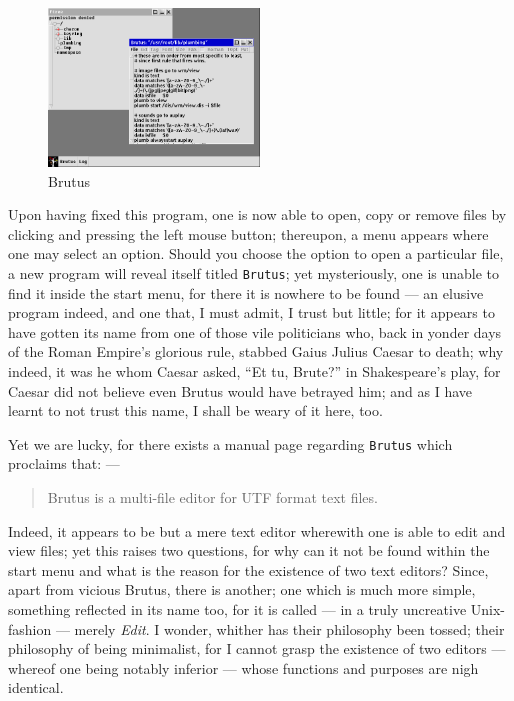 \documentclass[a5paper,twoside,12pt]{report}
\begin{document}
  \begin{figure}
    \centering
    \includegraphics[width=0.5\textwidth]{imgs/brutus.png}
    \caption{Brutus}
  \end{figure}

  Upon having fixed this program, one is now able to open, copy or remove files by clicking and pressing the left mouse button; thereupon, a menu appears where one may select an option. Should you choose the option to open a particular file, a new program will reveal itself titled \texttt{Brutus}; yet mysteriously, one is unable to find it inside the start menu, for there it is nowhere to be found — an elusive program indeed, and one that, I must admit, I trust but little; for it appears to have gotten its name from one of those vile politicians who, back in yonder days of the Roman Empire's glorious rule, stabbed Gaius Julius Caesar to death; why indeed, it was he whom Caesar asked, ``Et tu, Brute?'' in Shakespeare's play, for Caesar did not believe even Brutus would have betrayed him; and as I have learnt to not trust this name, I shall be weary of it here, too.
  
  Yet we are lucky, for there exists a manual page regarding \texttt{Brutus} which proclaims that: —

  \begin{quote}
    Brutus is a multi-file editor for UTF format text files.
  \end{quote}

  Indeed, it appears to be but a mere text editor wherewith one is able to edit and view files; yet this raises two questions, for why can it not be found within the start menu and what is the reason for the existence of two text editors? Since, apart from vicious Brutus, there is another; one which is much more simple, something reflected in its name too, for it is called — in a truly uncreative Unix-fashion — merely \textit{Edit}. I wonder, whither has their philosophy been tossed; their philosophy of being minimalist, for I cannot grasp the existence of two editors — whereof one being notably inferior — whose functions and purposes are nigh identical.
\end{document}
